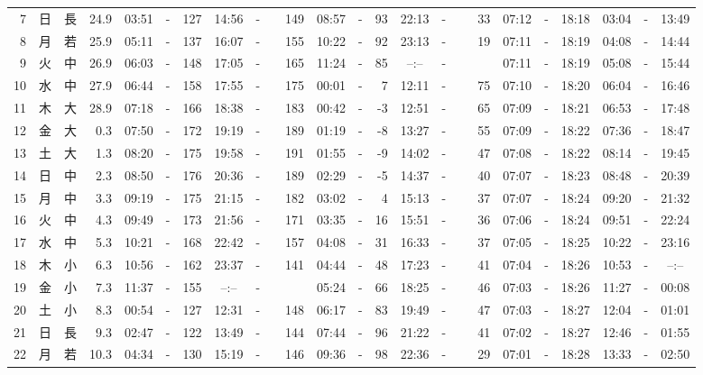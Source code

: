 \documentclass[12pt,a4j]{jsarticle}
\begin{document}
\begin{table}[htbp]
\begin{center}
{\begin{tabular}{|rc|cr|ccrccr|ccrccr|ccc|ccc|}
 7 & 日 & 長 & 24.9 &  03:51 &-& 127 &  14:56 &-& 149 &  08:57 &-&  93 &  22:13 &-&  33 & 07:12 & -& 18:18 & 03:04 & -& 13:49 \\
 8 & 月 & 若 & 25.9 &  05:11 &-& 137 &  16:07 &-& 155 &  10:22 &-&  92 &  23:13 &-&  19 & 07:11 & -& 18:19 & 04:08 & -& 14:44 \\
 9 & 火 & 中 & 26.9 &  06:03 &-& 148 &  17:05 &-& 165 &  11:24 &-&  85 &  --:-- &-&~~~~~ & 07:11 & -& 18:19 & 05:08 & -& 15:44 \\
10 & 水 & 中 & 27.9 &  06:44 &-& 158 &  17:55 &-& 175 &  00:01 &-&   7 &  12:11 &-&  75 & 07:10 & -& 18:20 & 06:04 & -& 16:46 \\
11 & 木 & 大 & 28.9 &  07:18 &-& 166 &  18:38 &-& 183 &  00:42 &-&  -3 &  12:51 &-&  65 & 07:09 & -& 18:21 & 06:53 & -& 17:48 \\
12 & 金 & 大 &  0.3 &  07:50 &-& 172 &  19:19 &-& 189 &  01:19 &-&  -8 &  13:27 &-&  55 & 07:09 & -& 18:22 & 07:36 & -& 18:47 \\
13 & 土 & 大 &  1.3 &  08:20 &-& 175 &  19:58 &-& 191 &  01:55 &-&  -9 &  14:02 &-&  47 & 07:08 & -& 18:22 & 08:14 & -& 19:45 \\
14 & 日 & 中 &  2.3 &  08:50 &-& 176 &  20:36 &-& 189 &  02:29 &-&  -5 &  14:37 &-&  40 & 07:07 & -& 18:23 & 08:48 & -& 20:39 \\
15 & 月 & 中 &  3.3 &  09:19 &-& 175 &  21:15 &-& 182 &  03:02 &-&   4 &  15:13 &-&  37 & 07:07 & -& 18:24 & 09:20 & -& 21:32 \\
16 & 火 & 中 &  4.3 &  09:49 &-& 173 &  21:56 &-& 171 &  03:35 &-&  16 &  15:51 &-&  36 & 07:06 & -& 18:24 & 09:51 & -& 22:24 \\
17 & 水 & 中 &  5.3 &  10:21 &-& 168 &  22:42 &-& 157 &  04:08 &-&  31 &  16:33 &-&  37 & 07:05 & -& 18:25 & 10:22 & -& 23:16 \\
18 & 木 & 小 &  6.3 &  10:56 &-& 162 &  23:37 &-& 141 &  04:44 &-&  48 &  17:23 &-&  41 & 07:04 & -& 18:26 & 10:53 & -& --:-- \\
19 & 金 & 小 &  7.3 &  11:37 &-& 155 &  --:-- &-&~~~~~ &  05:24 &-&  66 &  18:25 &-&  46 & 07:03 & -& 18:26 & 11:27 & -& 00:08 \\
20 & 土 & 小 &  8.3 &  00:54 &-& 127 &  12:31 &-& 148 &  06:17 &-&  83 &  19:49 &-&  47 & 07:03 & -& 18:27 & 12:04 & -& 01:01 \\
21 & 日 & 長 &  9.3 &  02:47 &-& 122 &  13:49 &-& 144 &  07:44 &-&  96 &  21:22 &-&  41 & 07:02 & -& 18:27 & 12:46 & -& 01:55 \\
22 & 月 & 若 & 10.3 &  04:34 &-& 130 &  15:19 &-& 146 &  09:36 &-&  98 &  22:36 &-&  29 & 07:01 & -& 18:28 & 13:33 & -& 02:50 \\

\end{tabular}}
\end{center}
\end{table}
\end{document}
